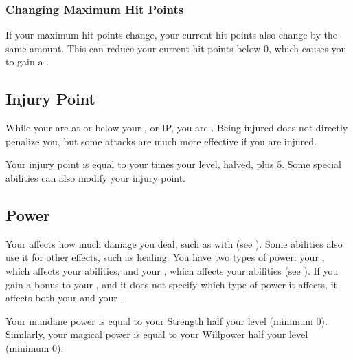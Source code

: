     \subsubsection{Changing Maximum Hit Points}
      If your maximum hit points change, your current hit points also change by the same amount.
      This can reduce your current hit points below 0, which causes you to gain a .

  \subsection{Injury Point}\label{Injury Point}
    While your  are at or below your , or IP, you are .
    Being injured does not directly penalize you, but some attacks are much more effective if you are injured.

    Your injury point is equal to your  times your level, halved, plus 5. 
    Some special abilities can also modify your injury point.

  \subsection{Power}\label{Power}
    Your  affects how much damage you deal, such as with  (see ).
    Some abilities also use it for other effects, such as healing.
    You have two types of power: your , which affects your \magical abilities, and your , which affects your  abilities (see ).
    If you gain a bonus to your , and it does not specify which type of power it affects, it affects both your  and your .

    Your mundane power is equal to your Strength \add half your level (minimum 0).
    Similarly, your magical power is equal to your Willpower \add half your level (minimum 0).
